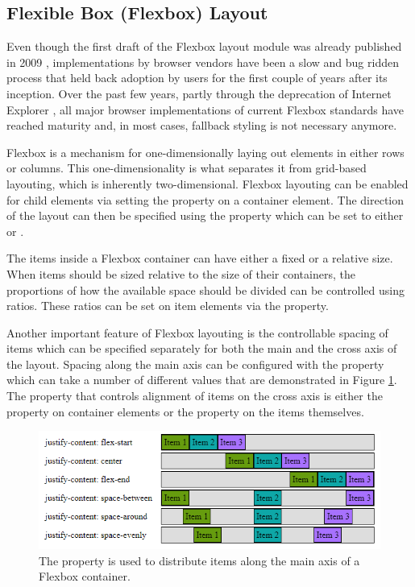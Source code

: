 \subsection{Flexible Box (Flexbox) Layout }
\label{sec:Flexbox}

Even though the first draft of the Flexbox layout module was already published in 2009 \parencite{CSSFlexboxFirstDraft}, implementations by browser vendors have been a slow and bug ridden process \parencite{CanIUseCSSFlexbox} that held back adoption by users for the first couple of years after its inception. 
Over the past few years, partly through the deprecation of Internet Explorer \parencite{IEDeprecation}, all major browser implementations of current Flexbox standards \parencite{CSSFlexbox} have reached maturity and, in most cases, fallback styling is not necessary anymore.

Flexbox is a mechanism for one-dimensionally laying out elements in either rows or columns. 
This one-dimensionality is what separates it from grid-based layouting, which is inherently two-dimensional. 
Flexbox layouting can be enabled for child elements via setting the  property on a container element. 
The direction of the layout can then be specified using the  property which can be set to either  or .

The items inside a Flexbox container can have either a fixed or a relative size. 
When items should be sized relative to the size of their containers, the proportions of how the available space should be divided can be controlled using ratios. 
These ratios can be set on item elements via the  property.

Another important feature of Flexbox layouting is the controllable spacing of items which can be specified separately for both the main and the cross axis of the layout. 
Spacing along the main axis can be configured with the  property which can take a number of different values that are demonstrated in Figure \ref{fig:FlexboxJustifyContent}. 
The property that controls alignment of items on the cross axis is either the  property on container elements or the  property on the items themselves.

\begin{figure}[tp]
\centering
\includegraphics[keepaspectratio,width=\linewidth,height=\fullh / 3]{images/flexbox-justify-content.png}
\caption[Flexbox Justify Content Property]{
  The  property is used to distribute items along the main axis of a Flexbox container. 
}
\label{fig:FlexboxJustifyContent}
\end{figure}

